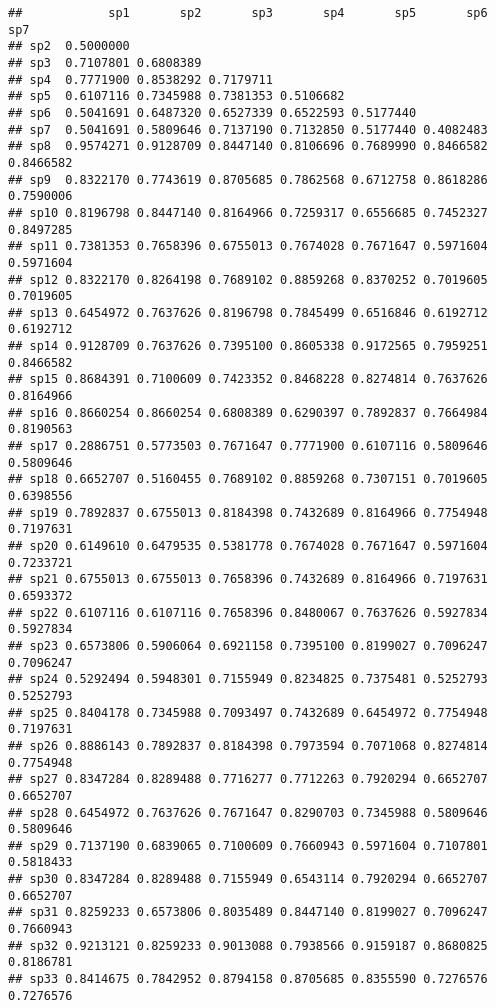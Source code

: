 \documentclass[
]{book}
\begin{document}
\begin{verbatim}
##            sp1       sp2       sp3       sp4       sp5       sp6       sp7
## sp2  0.5000000                                                            
## sp3  0.7107801 0.6808389                                                  
## sp4  0.7771900 0.8538292 0.7179711                                        
## sp5  0.6107116 0.7345988 0.7381353 0.5106682                              
## sp6  0.5041691 0.6487320 0.6527339 0.6522593 0.5177440                    
## sp7  0.5041691 0.5809646 0.7137190 0.7132850 0.5177440 0.4082483          
## sp8  0.9574271 0.9128709 0.8447140 0.8106696 0.7689990 0.8466582 0.8466582
## sp9  0.8322170 0.7743619 0.8705685 0.7862568 0.6712758 0.8618286 0.7590006
## sp10 0.8196798 0.8447140 0.8164966 0.7259317 0.6556685 0.7452327 0.8497285
## sp11 0.7381353 0.7658396 0.6755013 0.7674028 0.7671647 0.5971604 0.5971604
## sp12 0.8322170 0.8264198 0.7689102 0.8859268 0.8370252 0.7019605 0.7019605
## sp13 0.6454972 0.7637626 0.8196798 0.7845499 0.6516846 0.6192712 0.6192712
## sp14 0.9128709 0.7637626 0.7395100 0.8605338 0.9172565 0.7959251 0.8466582
## sp15 0.8684391 0.7100609 0.7423352 0.8468228 0.8274814 0.7637626 0.8164966
## sp16 0.8660254 0.8660254 0.6808389 0.6290397 0.7892837 0.7664984 0.8190563
## sp17 0.2886751 0.5773503 0.7671647 0.7771900 0.6107116 0.5809646 0.5809646
## sp18 0.6652707 0.5160455 0.7689102 0.8859268 0.7307151 0.7019605 0.6398556
## sp19 0.7892837 0.6755013 0.8184398 0.7432689 0.8164966 0.7754948 0.7197631
## sp20 0.6149610 0.6479535 0.5381778 0.7674028 0.7671647 0.5971604 0.7233721
## sp21 0.6755013 0.6755013 0.7658396 0.7432689 0.8164966 0.7197631 0.6593372
## sp22 0.6107116 0.6107116 0.7658396 0.8480067 0.7637626 0.5927834 0.5927834
## sp23 0.6573806 0.5906064 0.6921158 0.7395100 0.8199027 0.7096247 0.7096247
## sp24 0.5292494 0.5948301 0.7155949 0.8234825 0.7375481 0.5252793 0.5252793
## sp25 0.8404178 0.7345988 0.7093497 0.7432689 0.6454972 0.7754948 0.7197631
## sp26 0.8886143 0.7892837 0.8184398 0.7973594 0.7071068 0.8274814 0.7754948
## sp27 0.8347284 0.8289488 0.7716277 0.7712263 0.7920294 0.6652707 0.6652707
## sp28 0.6454972 0.7637626 0.7671647 0.8290703 0.7345988 0.5809646 0.5809646
## sp29 0.7137190 0.6839065 0.7100609 0.7660943 0.5971604 0.7107801 0.5818433
## sp30 0.8347284 0.8289488 0.7155949 0.6543114 0.7920294 0.6652707 0.6652707
## sp31 0.8259233 0.6573806 0.8035489 0.8447140 0.8199027 0.7096247 0.7660943
## sp32 0.9213121 0.8259233 0.9013088 0.7938566 0.9159187 0.8680825 0.8186781
## sp33 0.8414675 0.7842952 0.8794158 0.8705685 0.8355590 0.7276576 0.7276576

\end{verbatim}
\end{document}
